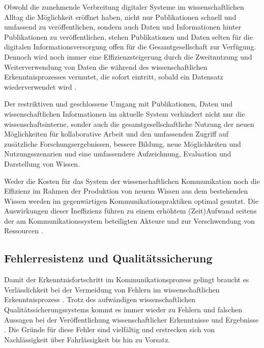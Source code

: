 Obwohl die zunehmende Verbreitung digitaler Systeme im wissenschaftlichen Alltag die Möglichkeit eröffnet haben, nicht nur Publikationen schnell und umfassend zu veröffentlichen, sondern auch Daten und Informationen hinter Publikationen zu veröffentlichen, stehen Publikationen und Daten selten für die digitalen Informationsversorgung offen für die Gesamtgesellschaft zur Verfügung. Dennoch wird noch immer eine Effizienzsteigerung durch die Zweitnutzung und Weiterverwendung von Daten die während des wissenschaftlichen Erkenntnisprozesses vermutet, die sofort eintritt, sobald ein Datensatz wiederverwendet wird \cite{RIN_2010_open_research}.

Der restriktiven und geschlossene Umgang mit Publikationen, Daten und wissenschaftlichen Informationen im aktuelle System verhindert nicht nur die wissenschaftsinterne, sonder auch die gesamtgesellschaftliche Nutzung der neuen Möglichkeiten für kollaborative Arbeit und den umfassenden Zugriff auf zusätzliche Forschungsergebnissen, bessere Bildung, neue Möglichkeiten und Nutzungsszenarien und eine umfassendere Aufzeichnung, Evaluation und Darstellung von Wissen.

Weder die Kosten für das System der wissenschaftlichen Kommunikation noch die Effizienz im Rahmen der Produktion von neuem Wissen aus dem bestehenden Wissen werden im gegenwärtigen Kommunikationspraktiken optimal genutzt. Die Auswirkungen dieser Ineffizienz führen zu einem erhöhtem (Zeit)Aufwand seitens der am Kommunikationssystem beteiligten Akteure und zur Verschwendung von Ressourcen \cite{nosek_2012_scientific}.

\subsection{Fehlerresistenz und Qualitätssicherung}

Damit der Erkenntnisfortschritt im Kommunikationsprozess gelingt braucht es Verlässlichkeit bei der Vermeidung von Fehlern im wissenschaftlichen Erkenntnisprozess \cite{Bargheer_2015}. Trotz des aufwändigen wissenschaftlichen Qualitätssicherungssystems kommt es immer wieder zu Fehlern und falschen Aussagen bei der Veröffentlichung wissenschaftlicher Erkenntnisse und Ergebnisse \cite{brembs2015open} \cite{Luescher_2014}. Die Gründe für diese Fehler sind vielfältig und erstrecken sich von Nachlässigkeit über Fahrlässigkeit bis hin zu Vorsatz.


